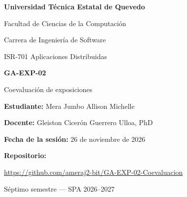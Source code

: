 \documentclass[11pt,a4paper]{article}
\newcommand{\repourl}{https://github.com/ameraj2-bit/GA-EXP-02-Coevaluacion}
\begin{document}
\centering
{\Large\bfseries Universidad Técnica Estatal de Quevedo\par}
\vspace{0.3cm}
{\large Facultad de Ciencias de la Computación\par}
{\large Carrera de Ingeniería de Software\par}
\vspace{2cm}
{\large ISR-701 Aplicaciones Distribuidas\par}
\vspace{0.5cm}
{\Huge\bfseries GA-EXP-02\par}
\vspace{0.3cm}
{\LARGE Coevaluación de exposiciones\par}
\vspace{2cm}
{\large\textbf{Estudiante:} Mera Jumbo Allison Michelle\par}
\vspace{0.3cm}
{\large\textbf{Docente:} Gleiston Cicerón Guerrero Ulloa, PhD\par}
\vspace{0.3cm}
{\large\textbf{Fecha de la sesión:} 26 de noviembre de 2026\par}
\vspace{2.5cm}
{\large\textbf{Repositorio:}\par}
\vspace{0.3cm}
\mbox{\large\url{\repourl}}\par
\vfill
{\large Séptimo semestre --- SPA 2026--2027\par}
\end{document}

